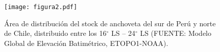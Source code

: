 \begin{figure}[H]
    \centering
    \texttt{[image: figura2.pdf]}  
    \caption{Área de distribución del stock de anchoveta del sur de Perú y norte de Chile, distribuido entre los 16$^\circ$ LS – 24$^\circ$ LS (FUENTE: Modelo Global de Elevación Batimétrico, ETOPO1-NOAA).}
    \label{fig:figure2}
\end{figure}  